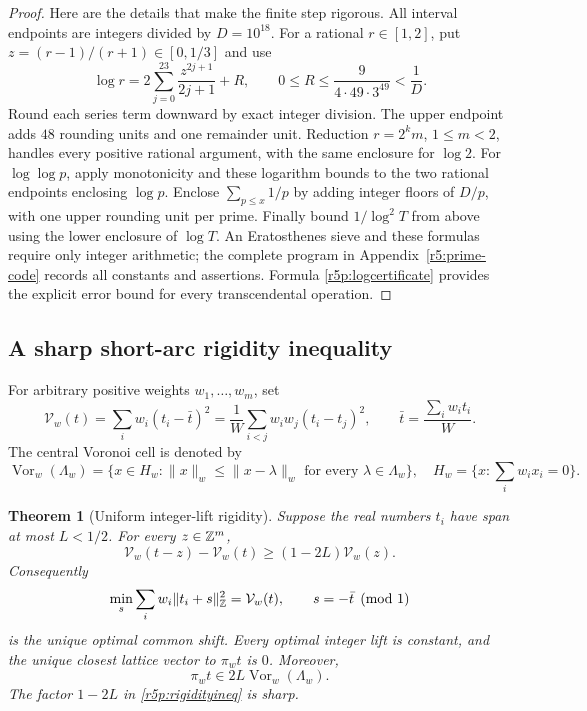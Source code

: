\documentclass[11pt,a4paper]{article}
\newtheorem{theorem}{Theorem}[section]
\theoremstyle{definition}\newtheorem{definition}[theorem]{Definition}
\theoremstyle{remark}\newtheorem{remark}[theorem]{Remark}
\numberwithin{equation}{section}
\begin{document}
\begin{proof}
Here are the details that make the finite step rigorous.  All
interval endpoints are integers divided by $D=10^{18}$.
For a rational $r\in[1,2]$, put $z=(r-1)/(r+1)\in[0,1/3]$ and use
\begin{equation}\label{r5p:logcertificate}
 \log r=2\sum_{j=0}^{23}\frac{z^{2j+1}}{2j+1}+R,
 \qquad
 0\leq R\leq\frac9{4\cdot49\cdot3^{49}}<\frac1D.
\end{equation}
Round each series term downward by exact integer division.  The
upper endpoint adds $48$ rounding units and one remainder unit.
Reduction $r=2^km$, $1\leq m<2$, handles every positive rational
argument, with the same enclosure for $\log2$.
For $\log\log p$, apply monotonicity and these logarithm bounds
to the two rational endpoints enclosing $\log p$.
Enclose $\sum_{p\leq x}1/p$ by adding integer floors of $D/p$,
with one upper rounding unit per prime.  Finally bound
$1/\log^2T$ from above using the lower enclosure of $\log T$.
An Eratosthenes sieve and these formulas require only integer
arithmetic; the complete program in Appendix~\ref{r5:prime-code}
records all constants and assertions. Formula \eqref{r5p:logcertificate}
provides the explicit error bound for every transcendental operation.
\end{proof}

\subsection{A sharp short-arc rigidity inequality}

For arbitrary positive weights $w_1,\ldots,w_m$, set
\[
 \mathcal V_w(t)=\sum_iw_i(t_i-\bar t)^2
       =\frac1W\sum_{i<j}w_iw_j(t_i-t_j)^2,
 \qquad \bar t=\frac{\sum_iw_it_i}{W}.
\]
The central Voronoi cell is denoted by
\[
 \operatorname{Vor}_w(\Lambda_w)
 =\{x\in H_w:\|x\|_w\leq\|x-\lambda\|_w
                  \text{ for every }\lambda\in\Lambda_w\},
 \quad H_w=\{x:\textstyle\sum_iw_ix_i=0\}.
\]

\begin{theorem}[Uniform integer-lift rigidity]\label{r5p:rigidity}
Suppose the real numbers $t_i$ have span at most $L<1/2$.
For every $z\in\mathbb Z^m$,
\begin{equation}\label{r5p:rigidityineq}
 \mathcal V_w(t-z)-\mathcal V_w(t)
       \geq(1-2L)\mathcal V_w(z).
\end{equation}
Consequently
\begin{equation}\label{r5p:exactlift}
 \min_s\sum_iw_i\|t_i+s\|_{\mathbb Z}^2=\mathcal V_w(t),
 \qquad s=-\bar t\pmod1
\end{equation}
is the unique optimal common shift.  Every optimal integer lift is
constant, and the unique closest lattice vector to $\pi_wt$ is $0$.
Moreover,
\begin{equation}\label{r5p:scaledVor}
 \pi_wt\in2L\operatorname{Vor}_w(\Lambda_w).
\end{equation}
The factor $1-2L$ in \eqref{r5p:rigidityineq} is sharp.
\end{theorem}
\end{document}
